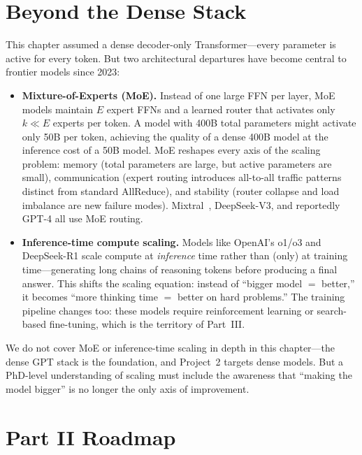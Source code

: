 \section{Beyond the Dense Stack}
\label{sec:frontier-variants}

This chapter assumed a dense decoder-only Transformer---every parameter is active for every token. But two architectural departures have become central to frontier models since 2023:

\begin{itemize}[nosep]
  \item \textbf{Mixture-of-Experts (MoE).} Instead of one large FFN per layer, MoE models maintain $E$ expert FFNs and a learned router that activates only $k \ll E$ experts per token. A model with 400B total parameters might activate only 50B per token, achieving the quality of a dense 400B model at the inference cost of a 50B model. MoE reshapes every axis of the scaling problem: memory (total parameters are large, but active parameters are small), communication (expert routing introduces all-to-all traffic patterns distinct from standard AllReduce), and stability (router collapse and load imbalance are new failure modes). Mixtral~\cite{jiang2024mixtral}, DeepSeek-V3, and reportedly GPT-4 all use MoE routing.
  \item \textbf{Inference-time compute scaling.} Models like OpenAI's o1/o3 and DeepSeek-R1 scale compute at \emph{inference} time rather than (only) at training time---generating long chains of reasoning tokens before producing a final answer. This shifts the scaling equation: instead of ``bigger model $=$ better,'' it becomes ``more thinking time $=$ better on hard problems.'' The training pipeline changes too: these models require reinforcement learning or search-based fine-tuning, which is the territory of Part~III.
\end{itemize}

We do not cover MoE or inference-time scaling in depth in this chapter---the dense GPT stack is the foundation, and Project~2 targets dense models. But a PhD-level understanding of scaling must include the awareness that ``making the model bigger'' is no longer the only axis of improvement.


\section{Part II Roadmap}
\label{sec:part2-roadmap}

